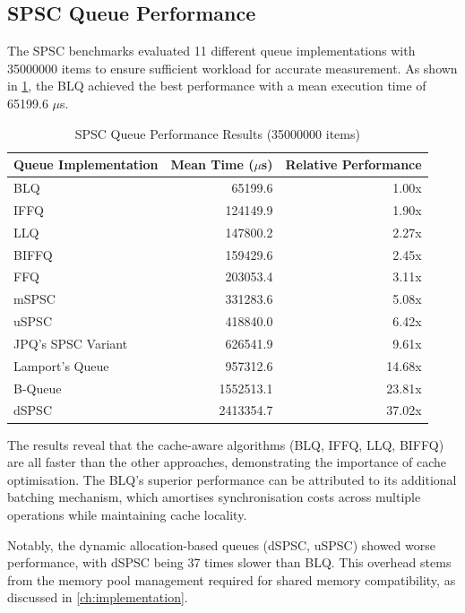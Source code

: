 \subsection{\acf{SPSC} Queue Performance}
The \ac{SPSC} benchmarks evaluated 11 different queue implementations with 35000000 items to ensure sufficient workload for accurate measurement. As shown in \cref{tab:spsc-results}, the \ac{BLQ} achieved the best performance with a mean execution time of 65199.6 $\mu$s.

\begin{table}[htb]
\centering
\caption{\ac{SPSC} Queue Performance Results (35000000 items)}
\label{tab:spsc-results}
\begin{tabular}{@{}lrr@{}}
\toprule
Queue Implementation & Mean Time ($\mu$s) & Relative Performance \\
\midrule
\ac{BLQ} & 65199.6 & 1.00x \\
\ac{IFFQ} & 124149.9 & 1.90x \\
\ac{LLQ} & 147800.2 & 2.27x \\
\ac{BIFFQ} & 159429.6 & 2.45x \\
\ac{FFQ} & 203053.4 & 3.11x \\
\ac{mSPSC} & 331283.6 & 5.08x \\
\ac{uSPSC} & 418840.0 & 6.42x \\
\ac{JPQ}'s \ac{SPSC} Variant & 626541.9 & 9.61x \\
Lamport's Queue & 957312.6 & 14.68x \\
B-Queue & 1552513.1 & 23.81x \\
\ac{dSPSC} & 2413354.7 & 37.02x \\
\bottomrule
\end{tabular}
\end{table}

The results reveal that the cache-aware algorithms (\ac{BLQ}, \ac{IFFQ}, \ac{LLQ}, \ac{BIFFQ}) are all faster than the other approaches, demonstrating the importance of cache optimisation. The \ac{BLQ}'s superior performance can be attributed to its additional batching mechanism, which amortises synchronisation costs across multiple operations while maintaining cache locality.

Notably, the dynamic allocation-based queues (\ac{dSPSC}, \ac{uSPSC}) showed worse performance, with \ac{dSPSC} being 37 times slower than \ac{BLQ}. This overhead stems from the memory pool management required for shared memory compatibility, as discussed in \cref{ch:implementation}.

